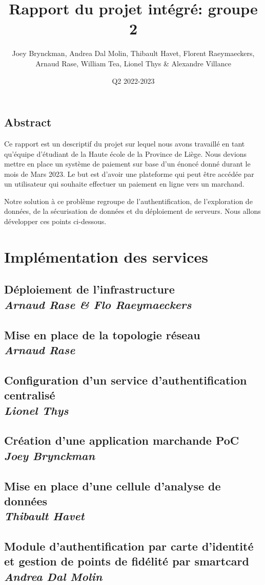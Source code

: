 \documentclass[11pt]{report}
\title{Rapport du projet intégré: groupe 2}
\author{Joey Brynckman, Andrea Dal Molin, Thibault Havet, Florent Raeymaeckers,  \\ Arnaud Rase, William Tea, Lionel Thys \& Alexandre Villance}
\date{Q2 2022-2023}
\newcommand\Chapter[2]{\chapter
  [#1\hfil\hbox{}\protect\linebreak{\itshape#2}]%
  {#1\\[2ex]\large\itshape#2}%
}
\begin{document}
\maketitle

\tableofcontents

\chapter*{Abstract}

Ce rapport est un descriptif du projet sur lequel nous avons travaillé en tant qu'équipe d'étudiant de la Haute école de la Province de Liège. Nous devions mettre en place un système de paiement sur base d'un énoncé donné durant le mois de Mars 2023. Le but est d'avoir une plateforme qui peut être accédée par un utilisateur qui souhaite effectuer un paiement en ligne vers un marchand.

Notre solution à ce problème regroupe de l'authentification, de l'exploration de données, de la sécurisation de données et du déploiement de serveurs. Nous allons développer ces points ci-dessous.


\part{Implémentation des services}

\Chapter{Déploiement de l'infrastructure}{Arnaud Rase \& Flo Raeymaeckers}



\Chapter{Mise en place de la topologie réseau}{Arnaud Rase}



\Chapter{Configuration d'un service d'authentification centralisé}{Lionel Thys}



\Chapter{Création d'une application marchande PoC}{Joey Brynckman}



\Chapter{Mise en place d'une cellule d'analyse de données}{Thibault Havet}



\Chapter{Module d'authentification par carte d'identité et gestion de points de fidélité par smartcard}{Andrea Dal Molin}


\end{document}
